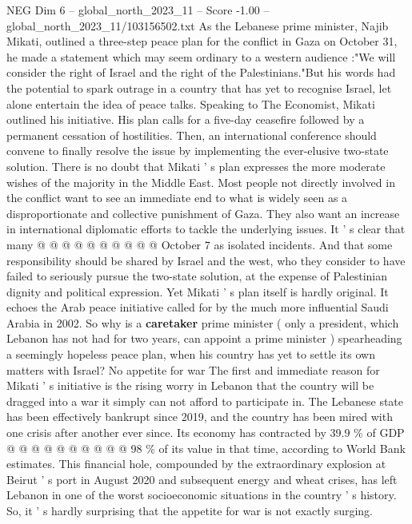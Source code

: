\begin{textsample}{NEG Dim 6 – global\_north\_2023\_11 – Score -1.00 – global\_north\_2023\_11/103156502.txt}  \label{ex:f6_neg_201}
As the Lebanese prime minister, Najib Mikati, outlined a three-step peace plan for the conflict in Gaza on October 31, he made a statement which may seem ordinary to a western audience :"We will consider the right of Israel and the right of the Palestinians."But his words had the potential to spark outrage in a country that has yet to recognise Israel, let alone entertain the idea of peace talks.
Speaking to The Economist, Mikati outlined his initiative.
His plan calls for a five-day ceasefire followed by a permanent cessation of hostilities.
Then, an international conference should convene to finally resolve the issue by implementing the ever-elusive two-state solution.
There is no doubt that Mikati ' s plan expresses the more moderate wishes of the majority in the Middle East.
Most people not directly involved in the conflict want to see an immediate end to what is widely seen as a disproportionate and collective punishment of Gaza.
They also want an increase in international diplomatic efforts to tackle the underlying issues.
It ' s clear that many @ @ @ @ @ @ @ @ @ @ October 7 as isolated incidents.
And that some responsibility should be shared by Israel and the west, who they consider to have failed to seriously pursue the two-state solution, at the expense of Palestinian dignity and political expression.
Yet Mikati ' s plan itself is hardly original.
It echoes the Arab peace initiative called for by the much more influential Saudi Arabia in 2002.
So why is a \textbf{caretaker} prime minister ( only a president, which Lebanon has not had for two years, can appoint a prime minister ) spearheading a seemingly hopeless peace plan, when his country has yet to settle its own matters with Israel?
No appetite for war The first and immediate reason for Mikati ' s initiative is the rising worry in Lebanon that the country will be dragged into a war it simply can not afford to participate in.
The Lebanese state has been effectively bankrupt since 2019, and the country has been mired with one crisis after another ever since.
Its economy has contracted by 39.9 \% of GDP @ @ @ @ @ @ @ @ @ @ 98 \% of its value in that time, according to World Bank estimates.
This financial hole, compounded by the extraordinary explosion at Beirut ' s port in August 2020 and subsequent energy and wheat crises, has left Lebanon in one of the worst socioeconomic situations in the country ' s history.
So, it ' s hardly surprising that the appetite for war is not exactly surging.

\end{textsample}
